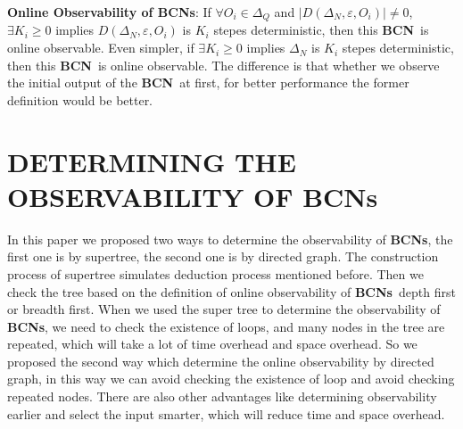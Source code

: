 \documentclass[letterpaper, 10 pt, conference]{ieeeconf}  %
\def \BCN {{\bf BCN}}
\def \BCNs {{\bf BCNs}}
\begin{document}
{\bf Online Observability of  BCNs}:
If $\forall  O_i\in \Delta_Q$ and $|D\left(\Delta_N,\varepsilon, O_i\right)|\neq 0$, $\exists K_i \ge 0$ implies $D\left(\Delta_N,\varepsilon,O_i\right)$ is $K_i$ stepes deterministic, then this \BCN\ is online observable. Even simpler, if $\exists K_i \ge 0$ implies $\Delta_N$ is $K_i$ stepes deterministic, then this \BCN\ is online observable. The difference is that whether we observe the initial output of the \BCN\ at first, for better performance the former definition would be better.

\section{DETERMINING THE OBSERVABILITY OF BCNs}

In this paper we proposed two ways to determine the observability of {\bf BCNs}, the first one is by supertree, the second one is by directed graph. The construction process of supertree simulates deduction process mentioned before. Then we check the tree based on the definition of online observability of \BCNs\ depth first or breadth first. When we used the super tree to determine the observability of {\bf BCNs}, we need to check the existence of loops, and many nodes in the tree are repeated, which will take a lot of time overhead and space overhead. So we proposed the second way which determine the online observability by directed graph,   in this way we can avoid checking the existence of loop and avoid checking repeated nodes. There are also other advantages like determining observability earlier and select the input smarter, which will reduce time and space overhead.    
\end{document}
